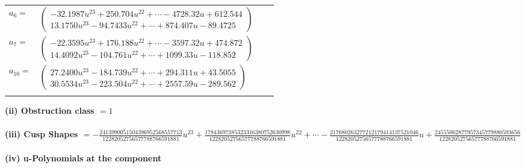 \documentclass[1p]{elsarticle_modified}
\theoremstyle{definition}
\begin{document}
\begin{tabular}{m{7pt} m{180pt} m{7pt} m{180pt} }
\flushright $a_{6}=$&$\begin{pmatrix}-32.1987 u^{23}+250.704 u^{22}+\cdots-4728.32 u+612.544\\13.1750 u^{23}-94.7433 u^{22}+\cdots+874.407 u-89.4725\end{pmatrix}$ \\
\flushright $a_{7}=$&$\begin{pmatrix}-22.3595 u^{23}+176.188 u^{22}+\cdots-3597.32 u+474.872\\14.4092 u^{23}-104.761 u^{22}+\cdots+1099.33 u-118.852\end{pmatrix}$ \\
\flushright $a_{10}=$&$\begin{pmatrix}27.2400 u^{23}-184.739 u^{22}+\cdots+294.311 u+43.5055\\30.5534 u^{23}-223.504 u^{22}+\cdots+2557.59 u-289.562\end{pmatrix}$\\&\end{tabular}
\flushleft \textbf{(ii) Obstruction class $= 1$}\\~\\
\flushleft \textbf{(iii) Cusp Shapes $= -\frac{2413990051504396952568557713}{12282052756577788766591881} u^{23}+\frac{17843697385323316380752630998}{12282052756577788766591881} u^{22}+\cdots-\frac{217680263277212179414137521046}{12282052756577788766591881} u+\frac{24555062877957345779880593656}{12282052756577788766591881}$}\\~\\
\newpage\renewcommand{\arraystretch}{1}
\flushleft \textbf{(iv) u-Polynomials at the component}\newline \\
\end{document}
